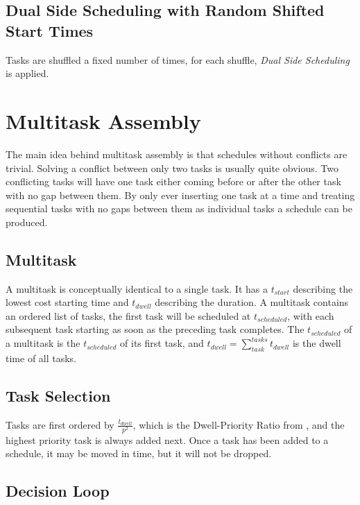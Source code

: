 \documentclass[conference]{IEEEtran}
\begin{document}
\subsection{Dual Side Scheduling with Random Shifted Start Times}

Tasks are shuffled a fixed number of times, for each shuffle, \emph{Dual Side Scheduling} is applied.

\section{Multitask Assembly}

The main idea behind multitask assembly is that schedules without conflicts are trivial.
Solving a conflict between only two tasks is usually quite obvious.
Two conflicting tasks will have one task either coming before or after the other task with no gap between them.
By only ever inserting one task at a time and treating sequential tasks with no gaps between them as individual tasks a schedule can be produced.

\subsection{Multitask}

A multitask is conceptually identical to a single task.
It has a $t_{start}$ describing the lowest cost starting time and $t_{dwell}$ describing the duration.
A multitask contains an ordered list of tasks, the first task will be scheduled at $t_{scheduled}$, with each subsequent task starting as soon as the preceding task completes.
The $t_{scheduled}$ of a multitask is the $t_{scheduled}$ of its first task, and $t_{dwell} = \sum_{task}^{tasks}t_{dwell}$ is the dwell time of all tasks.

\subsection{Task Selection}

Tasks are first ordered by $\frac{t_{dwell}}{p^2}$, which is the Dwell-Priority Ratio from \cite{poster}, and the highest priority task is always added next.
Once a task has been added to a schedule, it may be moved in time, but it will not be dropped.

\subsection{Decision Loop}
\end{document}
